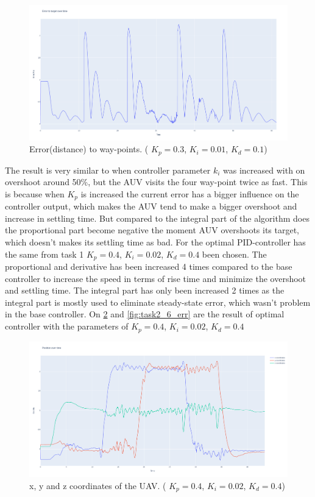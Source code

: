 \documentclass[conference]{IEEEtran}
\begin{document}
\begin{figure}[hbtp]
	\centering
	\includegraphics[width=1.0\linewidth]{images/task2_2_err.png}
	\caption{Error(distance) to way-points. ( $K_p = 0.3$, $K_i = 0.01$, $K_d = 0.1$)}
	\label{fig:task2_2_err}
\end{figure}

The result is very similar to when controller parameter $k_i$ was increased with on overshoot around 50\%, but the AUV visits the four way-point twice as fast. This is because when $K_p$ is increased the current error has a bigger influence on the controller output, which makes the AUV tend to make a bigger overshoot and increase in settling time. But compared to the integral part of the algorithm does the proportional part become negative the moment AUV overshoots its target, which doesn't makes its settling time as bad. 
For the optimal PID-controller has the same from task 1 $K_p = 0.4$, $K_i = 0.02$, $K_d = 0.4$ been chosen. 
The proportional and derivative has been increased 4 times compared to the base controller to increase the speed in terms of rise time and minimize the overshoot and settling time. The integral part has only been increased 2 times as the integral part is mostly used to eliminate steady-state error, which wasn't problem in the base controller. On \cref{fig:task2_6_pos} and \cref{fig:task2_6_err} are the result of optimal controller with the parameters of $K_p = 0.4$, $K_i = 0.02$, $K_d = 0.4$

\begin{figure}[hbtp]
	\centering
	\includegraphics[width=1.0\linewidth]{images/task2_6_pos.png}
	\caption{x, y and z coordinates of the UAV. ( $K_p = 0.4$, $K_i = 0.02$, $K_d = 0.4$)}
	\label{fig:task2_6_pos}
\end{figure}
\end{document}
